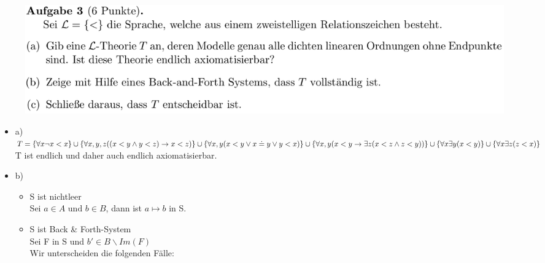 \documentclass[a4paper]{scrartcl}%
\begin{document}
\section*{}
\label{sec:aufgabe_3}

    \begin{figure}[H]
        \includegraphics[scale=0.3]{./A-3.png}
        \label{fig:}
    \end{figure}

    \begin{itemize}
        \item a)\\
            $T =\\
            \{\forall x \neg x < x\} \cup \\
            \{\forall x,y,z ((x < y \land y < z) \rightarrow x <z)\} \cup \\
            \{\forall x,y (x < y \lor x \doteq y \lor y < x)\} \cup \\
            \{\forall x,y (x < y \rightarrow \exists z (x<z \land z < y))\} \cup \\
            \{\forall x \exists y (x < y)\} \cup \\
            \{\forall x \exists z (z < x)\}\\$
            \\T ist endlich und daher auch endlich axiomatisierbar.\\
        \item b)\\
            \begin{itemize}
                \item S ist nichtleer\\
                    Sei $a \in A \text{ und } b \in B$, dann ist $a \mapsto b$ in S.\\
                \item S ist Back \& Forth-System
                    \\
                    Sei F in S und $b' \in B\backslash Im(F)$\\
                    Wir unterscheiden die folgenden Fälle:\\
                    \begin{itemize}

\end{itemize}
\end{itemize}
\end{itemize}
\end{document}
